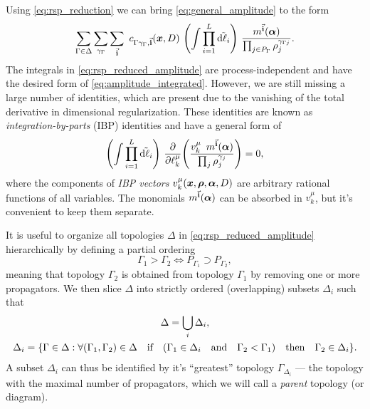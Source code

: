Using \cref{eq:rsp_reduction} we can bring \cref{eq:general_amplitude} to the form 
\begin{equation} \label{eq:rsp_reduced_amplitude}
  \sum_{\Gamma \in \Delta} \sum_{\gamma_\Gamma} \sum_{\va{i}} ~ c_{\Gamma\gamma_\Gamma, \va{i}} (\vb*{x},D) ~ 
  \qty(\int \prod_{i=1}^{L} \tilde{\dd{\ell_i}}) ~  
  \frac{m^{\va{i}}(\vb*{\alpha})%
    }{\prod_{j\in P_\Gamma} \rho_j^{\gamma_{\Gamma j}}}.
\end{equation}
The integrals in \cref{eq:rsp_reduced_amplitude} are process-independent and have the desired form of \cref{eq:amplitude_integrated}.
However, we are still missing a large number of identities, which are present due to the vanishing of the total derivative in dimensional regularization.
These identities are known as \emph{integration-by-parts} (IBP) identities \cite{Chetyrkin:1981qh,Tkachov:1981wb} and have a general
form of
\begin{equation}
  \qty(\int \prod_{i=1}^{L} \tilde{\dd{\ell_i}}) ~  \pdv{\ell_k^\mu}(
  \frac{ v_k^\mu \ommit{(\vb*{x},\vb*{\rho},\vb*{\alpha},D)} ~ \, m^{\va{i}}(\vb*{\alpha})
    }{\prod_{j} \rho_j^{\gamma_{j}}}
    ) = 0,
  \label{eq:ibps}
\end{equation}
where the components of \emph{IBP vectors} $v_k^\mu(\vb*{x},\vb*{\rho},\vb*{\alpha},D)$ are arbitrary rational functions
of all variables. The monomials $m^{\va{i}}(\vb*{\alpha})$ can be absorbed in $v_k^\mu$, but
it's convenient to keep them separate.

It is useful to organize all topologies $\Delta$ in \cref{eq:rsp_reduced_amplitude}
hierarchically by defining a partial ordering
\begin{equation} \label{eq:topology_order}
    \Gamma_1 > \Gamma_2 \iff P_{\Gamma_1} \supset P_{\Gamma_2},
\end{equation}
meaning that topology $\Gamma_2$ is obtained from topology $\Gamma_1$ by removing one or more propagators.
We then slice $\Delta$ into strictly ordered (overlapping) subsets $\Delta_i$ such that
\begin{subequations} \label{eq:topology_sequence}
    \begin{gather}
         \Delta = \bigcup_i \Delta_i,  \\
         \Delta_i  = \{\Gamma \in \Delta : \forall (\Gamma_1, \Gamma_2) \in\Delta \qif\qty( \Gamma_1 \in \Delta_i \qand \Gamma_2 < \Gamma_1) \qthen \Gamma_2 \in \Delta_i \}.
    \end{gather}
\end{subequations}
A subset $\Delta_i$ can thus be identified by it's ``greatest'' topology $\Gamma_{\Delta_i}$ ---
the topology with the maximal number of propagators, which we will call a \emph{parent} topology (or diagram).

